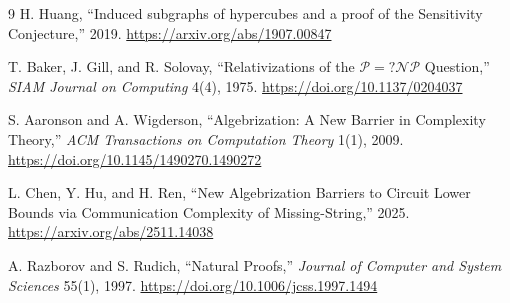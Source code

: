 \documentclass[11pt]{article}
\begin{document}
\begin{thebibliography}{9}
H. Huang, ``Induced subgraphs of hypercubes and a proof of the Sensitivity
Conjecture,'' 2019. \url{https://arxiv.org/abs/1907.00847}

T. Baker, J. Gill, and R. Solovay, ``Relativizations of the
$\mathcal P=?\mathcal{NP}$ Question,'' \emph{SIAM Journal on Computing} 4(4),
1975. \url{https://doi.org/10.1137/0204037}

S. Aaronson and A. Wigderson, ``Algebrization: A New Barrier in Complexity
Theory,'' \emph{ACM Transactions on Computation Theory} 1(1), 2009.
\url{https://doi.org/10.1145/1490270.1490272}

L. Chen, Y. Hu, and H. Ren, ``New Algebrization Barriers to Circuit Lower
Bounds via Communication Complexity of Missing-String,'' 2025.
\url{https://arxiv.org/abs/2511.14038}

A. Razborov and S. Rudich, ``Natural Proofs,'' \emph{Journal of Computer and
System Sciences} 55(1), 1997. \url{https://doi.org/10.1006/jcss.1997.1494}
\end{thebibliography}
\end{document}
